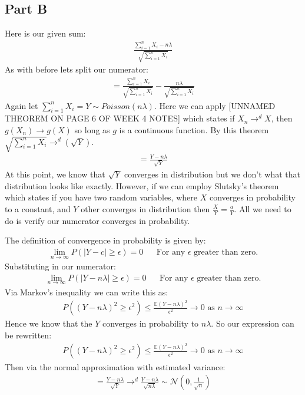 \documentclass{article}
\begin{document}
\subsection*{Part B}
Here is our given sum:
\begin{align*}
\frac{\sum_{i=1}^{n} X_i - n\lambda}{\sqrt{\sum_{i=1}^{n} X_i}}
\end{align*}
As with before lets split our numerator:
\begin{align*}
= \frac{\sum_{i=1}^{n} X_i}{{\sqrt{\sum_{i=1}^{n} X_i}}} - \frac{n\lambda}{\sqrt{\sum_{i=1}^{n} X_i}}
\end{align*}
Again let $\sum_{i=1}^{n} X_i=Y \sim Poisson(n\lambda)$. Here we can apply [UNNAMED THEOREM ON PAGE 6 OF WEEK 4 NOTES] which states if $X_n \rightarrow^d X$, then $g(X_n) \rightarrow g(X)$ so long as $g$ is a continuous function. By this theorem $\sqrt{\sum_{i=1}^{n} X_i} \rightarrow^d (\sqrt{Y})$.
\begin{align*}
= \frac{Y -n\lambda}{\sqrt{Y}}
\end{align*}
At this point, we know that $\sqrt{Y}$ converges in distribution but we don't what that distribution looks like exactly. However, if we can employ Slutsky's theorem which states if you have two random variables, where $X$ converges in probability to a constant, and $Y$ other converges in distribution then $\frac{X}{Y} = \frac{a}{Y}$. All we need to do is verify our numerator converges in probability.

The definition of convergence in probability is given by:
\begin{align*}
\lim_{n\rightarrow \infty} P(|Y - c| \geq \epsilon) = 0 && \text{For any }\epsilon\text{ greater than zero.}
\end{align*}
Substituting in our numerator:
\begin{align*}
\lim_{n\rightarrow \infty} P(|Y - n\lambda| \geq \epsilon) = 0 && \text{For any }\epsilon\text{ greater than zero.}
\end{align*}
Via Markov's inequality we can write this as:
\begin{align*}
P((Y - n\lambda)^2 \geq \epsilon^2) \leq \frac{\mathbb{E}(Y-n\lambda)^2}{\epsilon^2} \rightarrow 0  \text{ as }n\rightarrow \infty
\end{align*}
Hence we know that the $Y$ converges in probability to $n\lambda$. So our expression can be rewritten:
\begin{align*}
P((Y - n\lambda)^2 \geq \epsilon^2) \leq \frac{\mathbb{E}(Y-n\lambda)^2}{\epsilon^2} \rightarrow 0  \text{ as }n\rightarrow \infty
\end{align*}
Then via the normal approximation with estimated variance:
\begin{align*}
\boxed{ = \frac{Y -n\lambda}{\sqrt{Y}} \rightarrow^d \frac{Y -n\lambda}{\sqrt{n\lambda}} \sim \mathcal{N}(0,\frac{1}{\sqrt{n}}) }
\end{align*}
\end{document}
